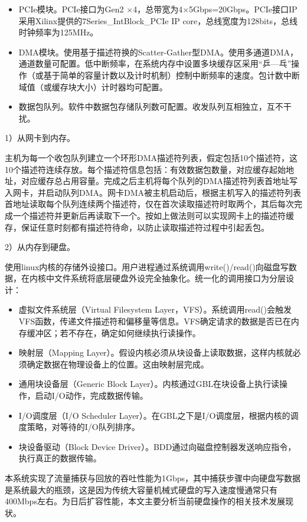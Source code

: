 \begin{itemize}
	\item PCIe模块。PCIe接口为Gen2 $\times$4，总带宽为4$\times$5Gbps=20Gbps。PCIe接口IP采用Xilinx提供的7Series\_IntBlock\_PCIe IP core，总线宽度为128bits，总线时钟频率为125MHz。
	\item DMA模块。使用基于描述符换的Scatter-Gather型DMA。使用多通道DMA，通道数量可配置。低中断频率，在系统内存中设置多块缓存区采用“乒---乓”操作（或基于简单的容量计数以及计时机制）控制中断频率的速度。包计数中断域值（或缓存块大小）计时器均可配置。
	\item 数据包队列。软件中数据包存储队列数可配置。收发队列互相独立，互不干扰。
\end{itemize}

1）从网卡到内存。

主机为每一个收包队列建立一个环形DMA描述符列表，假定包括10个描述符，这10个描述符连续存放。每个描述符信息包括：有效数据包数量，对应缓存起始地址，对应缓存总占用容量。完成之后主机将每个队列的DMA描述符列表首地址写入网卡，并启动队列DMA。网卡DMA被主机启动后，根据主机写入的描述符列表首地址读取每个队列连续两个描述符，仅在首次读取描述符时取两个，其后每次完成一个描述符并更新后再读取下一个。按如上做法则可以实现网卡上的描述符缓存，保证任意时刻都有描述符待命，以防止读取描述符过程中引起丢包。

2）从内存到硬盘。

使用linux内核的存储外设接口。用户进程通过系统调用write()/read()向磁盘写数据，在内核中文件系统将底层硬盘外设完全抽象化。统一化的调用接口为分层设计：

\begin{itemize}
	\item 虚拟文件系统层（Virtual Filesystem Layer，VFS）。系统调用read()会触发VFS函数，传递文件描述符和偏移量等信息。VFS确定请求的数据是否已在内存缓冲区；若不存在，确定如何继续执行读操作。
	\item 映射层（Mapping Layer）。假设内核必须从块设备上读取数据，这样内核就必须确定数据在物理设备上的位置。这由映射层完成。
	\item 通用块设备层（Generic Block Layer）。内核通过GBL在块设备上执行读操作，启动I/O动作，完成数据传输。
	\item I/O调度层（I/O Scheduler Layer）。在GBL之下是I/O调度层，根据内核的调度策略，对等待的I/O队列排序。
	\item 块设备驱动（Block Device Driver）。BDD通过向磁盘控制器发送响应指令，执行真正的数据传输。
\end{itemize}

本系统实现了流量捕获与回放的吞吐性能为1Gbps，其中捕获步骤中向硬盘写数据是系统最大的瓶颈，这是因为传统大容量机械式硬盘的写入速度慢通常只有400Mbps左右。为日后扩容性能，本文主要分析当前硬盘操作的相关技术发展现状。

